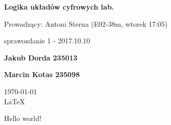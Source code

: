 \documentclass[12pt,a4paper]{report}
\begin{document}
	
	\begin{titlepage}
		
		\centering
		{\huge\bfseries Logika układów cyfrowych lab.\par}
		
		\vspace{0.5cm}
		Prowadzący: Antoni Sterna (E02-38m, wtorek 17:05) \\
	
		\vspace{1.1cm}
		{\Large sprawozdanie 1 - 2017.10.10\par}
		\vfill
		
		{\large\bfseries Jakub Dorda 235013\par}
		{\large\bfseries Marcin Kotas 235098\par}
		
		\vspace{1cm}
		\today \\ \LaTeX
		
		\restoregeometry
	\end{titlepage}
	
	Hello world!
	
	
\end{document}
